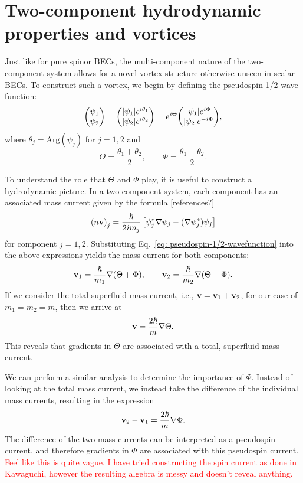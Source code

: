 \section{Two-component hydrodynamic properties and vortices}
Just like for pure spinor BECs, the multi-component nature of the two-component
system allows for a novel vortex structure otherwise unseen in scalar BECs.
To construct such a vortex, we begin by defining the pseudospin-1/2
wave function:
\begin{equation}
    \mqty(\psi_1 \\ \psi_2) = 
    \mqty(|\psi_1|e^{i\theta_1} \\ |\psi_2|e^{i\theta_2}) = 
    e^{i\Theta}\mqty(|\psi_1|e^{i\Phi} \\ |\psi_2|e^{-i\Phi}),
    \label{eq: pseudospin-1/2-wavefunction}  
\end{equation}
where \( \theta_j=\mathrm{Arg}(\psi_j) \) for \( j=1,2 \) and
\begin{equation}\label{eq: Theta-Phi}
    \Theta = \frac{\theta_1 + \theta_2}{2}, \qquad 
    \Phi = \frac{\theta_1 - \theta_2}{2}.
\end{equation}

To understand the role that \(\Theta \) and \(\Phi \) play, it is useful to
construct a hydrodynamic picture.
In a two-component system, each component has an associated mass current given
by the formula [references?]
\begin{equation}
    {(n\vb{v})}_j=\frac{\hbar}{2im_j}
    \left[\psi_j^*\nabla\psi_j-(\nabla\psi_j^*)\psi_j\right]
    \label{eq: two-comp-mass-current}
\end{equation}
for component \(j=1,2\).
Substituting Eq.~\eqref{eq: pseudospin-1/2-wavefunction} into the above
expressions yields the mass current for both components:
\begin{equation}
    \vb{v}_1 = \frac{\hbar}{m_1}\nabla(\Theta + \Phi), \qquad
    \vb{v}_2 = \frac{\hbar}{m_2}\nabla(\Theta - \Phi).
\end{equation}
If we consider the total superfluid mass current, i.e.,
\(\vb{v} = \vb{v}_1 + \vb{v}_2\), for our case of \(m_1=m_2=m\), then we arrive
at
\begin{equation}
    \vb{v} = \frac{2\hbar}{m}\nabla\Theta.
    \label{eq: two-comp-velocity}
\end{equation}
This reveals that gradients in \(\Theta \) are associated with a total,
superfluid mass current.

We can perform a similar analysis to determine the importance of \(\Phi \).
Instead of looking at the total mass current, we instead take the difference
of the individual mass currents, resulting in the expression
\begin{equation}
    \vb{v}_2 - \vb{v}_1 = \frac{2\hbar}{m}\nabla\Phi.
\end{equation}
The difference of the two mass currents can be interpreted as a pseudospin
current, and therefore gradients in \(\Phi \) are associated with this
pseudospin current.
\textcolor{red}{Feel like this is quite vague. I have tried constructing the
spin current as done in Kawaguchi, however the resulting algebra is messy and
doesn't reveal anything.}

